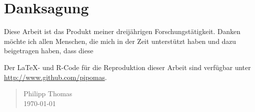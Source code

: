 \documentclass[11pt, twoside, a4paper]{book}		%
\begin{document}
\renewcommand{\contentsname}{Inhalte}			%
\setcounter{tocdepth}{3}						%
\tableofcontents								%

\renewcommand\listfigurename{Abbildungen}		%
\listoffigures									%



\renewcommand\listtablename{Tabellen}			%
\listoftables 									%



\chapter*{\large{Danksagung} \label{cha:Vorwort}}
Diese Arbeit ist das Produkt meiner dreijährigen Forschungstätigkeit. Danken möchte ich 
allen Menschen, die mich in der Zeit unterstützt haben und dazu beigetragen haben, dass diese
\citep{Upper1974} 
\citep{Pahud2016}

Der \LaTeX- und R-Code für die Reproduktion dieser Arbeit sind verfügbar unter \url{http://www.github.com/pipomas}.


\vspace{6 mm}

\begin{quote}
Philipp Thomas\\
\today
\end{quote}
\end{document}
